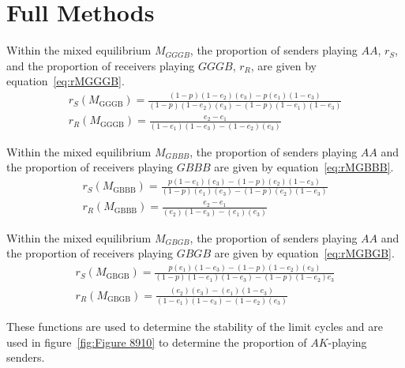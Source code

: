 \documentclass[a4paper,12pt]{article}
\numberwithin{equation}{section}
\begin{document}
\newpage


\section{Full Methods}
\label{sec:Full Methods}

Within the mixed equilibrium $M_{GGGB}$, the proportion of senders playing $AA$, $r_{S}$, and the proportion of receivers playing $GGGB$, $r_{R}$, are given by equation~\ref{eq:rMGGGB}.
\begin{subequations}
\label{eq:rMGGGB}
\begin{gather}
r_{S}(M_{\text{GGGB}})=\frac{(1-p)(1-e_{2})(e_{3})-p(e_{1})(1-e_{3})}{(1-p)(1-e_{2})(e_{3})-(1-p)(1-e_{1})(1-e_{3})}\\
r_{R}(M_{\text{GGGB}})=\frac{e_{2}-e_{1}}{(1-e_{1})(1-e_{3})-(1-e_{2})(e_{3})}
\end{gather}
\end{subequations}

Within the mixed equilibrium $M_{GBBB}$, the proportion of senders playing $AA$ and the proportion of receivers playing $GBBB$ are given by equation~\ref{eq:rMGBBB}.
\begin{subequations}
\label{eq:rMGBBB}
\begin{gather}
r_{S}(M_{\text{GBBB}})=\frac{p(1-e_{1})(e_{3})-(1-p)(e_{2})(1-e_{3})}{(1-p)(e_{1})(e_{3})-(1-p)(e_{2})(1-e_{3})}\\
r_{R}(M_{\text{GBBB}})=\frac{e_{2}-e_{1}}{(e_{2})(1-e_{3})-(e_{1})(e_{3})}
\end{gather}
\end{subequations}

Within the mixed equilibrium $M_{GBGB}$, the proportion of senders playing $AA$ and the proportion of receivers playing $GBGB$ are given by equation~\ref{eq:rMGBGB}.
\begin{subequations}
\label{eq:rMGBGB}
\begin{gather}
r_{S}(M_{\text{GBGB}})=\frac{p(e_{1})(1-e_{3})-(1-p)(1-e_{2})(e_{3})}{(1-p)(1-e_{1})(1-e_{3})-(1-p)(1-e_{2})e_{3}}\\
r_{R}(M_{\text{GBGB}})=\frac{(e_{2})(e_{3})-(e_{1})(1-e_{3})}{(1-e_{1})(1-e_{3})-(1-e_{2})(e_{3})}
\end{gather}
\end{subequations}

These functions are used to determine the stability of the limit cycles and are used in figure~\ref{fig:Figure 8910} to determine the proportion of $AK$-playing senders.
\end{document}
